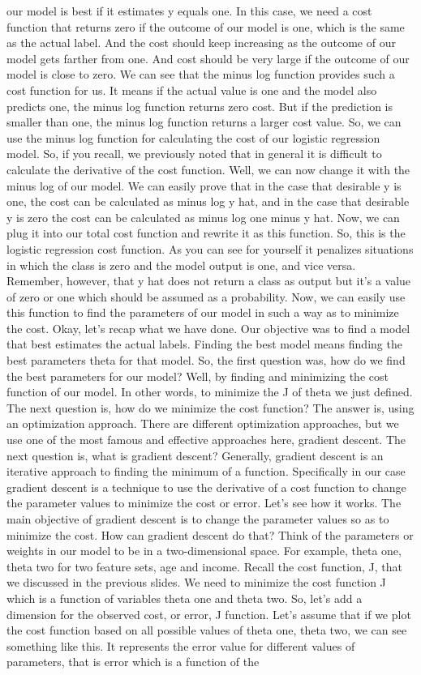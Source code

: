 our model is best if it estimates y equals one. In this case, we need a cost function that returns zero if the outcome of our model is one, which is the same as the actual label. And the cost should keep increasing as the outcome of our model gets farther from one. And cost should be very large if the outcome of our model is close to zero. We can see that the minus log function provides such a cost function for us. It means if the actual value is one and the model also predicts one, the minus log function returns zero cost. But if the prediction is smaller than one, the minus log function returns a larger cost value. So, we can use the minus log function for calculating the cost of our logistic regression model. So, if you recall, we previously noted that in general it is difficult to calculate the derivative of the cost function. Well, we can now change it with the minus log of our model. We can easily prove that in the case that desirable y is one, the cost can be calculated as minus log y hat, and in the case that desirable y is zero the cost can be calculated as minus log one minus y hat. Now, we can plug it into our total cost function and rewrite it as this function. So, this is the logistic regression cost function. As you can see for yourself it penalizes situations in which the class is zero and the model output is one, and vice versa. Remember, however, that y hat does not return a class as output but it's a value of zero or one which should be assumed as a probability. Now, we can easily use this function to find the parameters of our model in such a way as to minimize the cost. Okay, let's recap what we have done. Our objective was to find a model that best estimates the actual labels. Finding the best model means finding the best parameters theta for that model. So, the first question was, how do we find the best parameters for our model? Well, by finding and minimizing the cost function of our model. In other words, to minimize the J of theta we just defined. The next question is, how do we minimize the cost function? The answer is, using an optimization approach. There are different optimization approaches, but we use one of the most famous and effective approaches here, gradient descent. The next question is, what is gradient descent? Generally, gradient descent is an iterative approach to finding the minimum of a function. Specifically in our case gradient descent is a technique to use the derivative of a cost function to change the parameter values to minimize the cost or error. Let's see how it works. The main objective of gradient descent is to change the parameter values so as to minimize the cost. How can gradient descent do that? Think of the parameters or weights in our model to be in a two-dimensional space. For example, theta one, theta two for two feature sets, age and income. Recall the cost function, J, that we discussed in the previous slides. We need to minimize the cost function J which is a function of variables theta one and theta two. So, let's add a dimension for the observed cost, or error, J function. Let's assume that if we plot the cost function based on all possible values of theta one, theta two, we can see something like this. It represents the error value for different values of parameters, that is error which is a function of the 